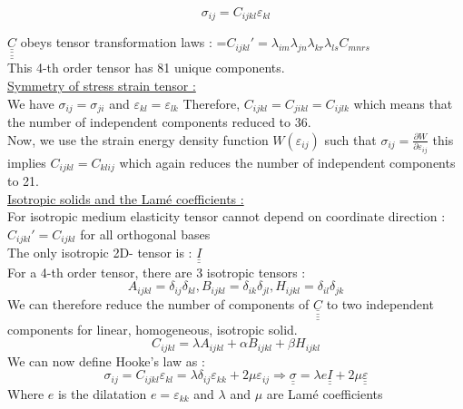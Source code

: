 \documentclass[../main.tex]{subfiles}
\begin{document}
\begin{equation}
    \sigma_{ij} = C_{ijkl} \varepsilon_{kl}
\end{equation}

$\underline{\underline{\underline{\underline{C}}}}$ obeys tensor transformation laws : =$C_{ijkl}' = \lambda_{im} \lambda_{jn} \lambda_{kr} \lambda_{ls} C_{mnrs}$\\
This 4-th order tensor has 81 unique components.\\

\quad \underline{Symmetry of stress strain tensor :}\\

We have $\sigma_{ij} = \sigma_{ji}$ and $\varepsilon_{kl} = \varepsilon_{lk}$ Therefore, $C_{ijkl} = C_{jikl} = C_{ijlk}$ which means that the number of independent components reduced to 36.\\

Now, we use the strain energy density function $W(\varepsilon_{ij})$ such that $\sigma_{ij} = \frac{\partial W}{\partial \varepsilon_{ij}}$ this implies $C_{ijkl} = C_{klij}$ which again reduces the number of independent components to 21.\\

\quad \underline{Isotropic solids and the Lamé coefficients :}\\
For isotropic medium elasticity tensor cannot depend on coordinate direction : $C_{ijkl}' = C_{ijkl}$ for all orthogonal bases\\

The only isotropic 2D- tensor is : $\underline{\underline{I}}$\\
For a 4-th order tensor, there are 3 isotropic tensors : \begin{equation}
    A_{ijkl} = \delta_{ij} \delta_{kl}, B_{ijkl} = \delta_{ik} \delta_{jl}, H_{ijkl} = \delta_{il} \delta_{jk}
\end{equation}
We can therefore reduce the number of components of $\underline{\underline{\underline{\underline{C}}}}$ to two independent components for linear, homogeneous, isotropic solid.\\
\begin{equation}
    C_{ijkl} = \lambda A_{ijkl} + \alpha B_{ijkl} + \beta H_{ijkl}
\end{equation}
We can now define Hooke's law as :\\
\begin{equation}
    \sigma_{ij} = C_{ijkl} \varepsilon_{kl} = \lambda \delta_{ij} \varepsilon_{kk} + 2\mu \varepsilon_{ij} \Rightarrow \underline{\underline{\sigma}} = \lambda e \underline{\underline{I}}+2 \mu \underline{\underline{\varepsilon}} 
\end{equation}
Where $e$ is the dilatation $e = \varepsilon_{kk}$ and $\lambda$ and $\mu$ are Lamé coefficients\\
\end{document}
